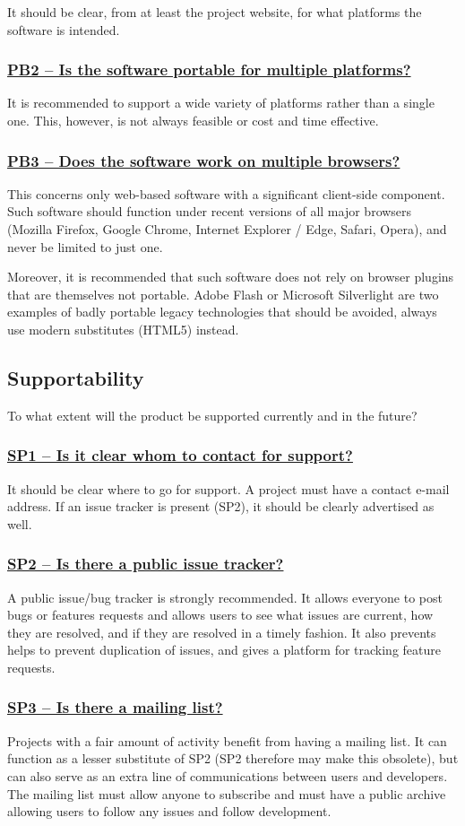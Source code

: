 \documentclass[a4paper,11pt]{article}
\newcommand{\indicator}[1]{\subsubsection*{\underline{#1}}}
\begin{document}
It should be clear, from at least the project website, for what platforms the software
is intended.

\indicator{PB2 -- Is the software portable for multiple platforms?}

It is recommended to support a wide variety of platforms rather than a single
one. This, however, is not always feasible or cost and time effective.

\indicator{PB3 -- Does the software work on multiple browsers?}

This concerns only web-based software with a significant client-side component.
Such software should function under recent versions of all major browsers
(Mozilla Firefox, Google Chrome, Internet Explorer / Edge, Safari, Opera), and
never be limited to just one.

Moreover, it is recommended that such software does not rely on browser plugins that
are themselves not portable. Adobe Flash or Microsoft Silverlight are two
examples of badly portable legacy technologies that should be avoided, always use
modern substitutes (HTML5) instead.

\subsection{Supportability}

To what extent will the product be supported currently and in the future?

\indicator{SP1 -- Is it clear whom to contact for support?}

It should be clear where to go for support. A project must have a contact
e-mail address. If an issue tracker is present (SP2), it should be clearly advertised
as well.

\indicator{SP2 -- Is there a public issue tracker?}

A public issue/bug tracker is strongly recommended. It allows everyone to post
bugs or features requests and allows users to see what issues are current, how
they are resolved, and if they are resolved in a timely fashion. It also
prevents helps to prevent duplication of issues, and gives a platform for
tracking feature requests.

\indicator{SP3 -- Is there a mailing list?}

Projects with a fair amount of activity benefit from having a mailing list. It
can function as a lesser substitute of SP2 (SP2 therefore may make this
obsolete), but can also serve as an extra line of communications between users
and developers. The mailing list must allow anyone to subscribe and must have a
public archive allowing users to follow any issues and follow development.
\end{document}
